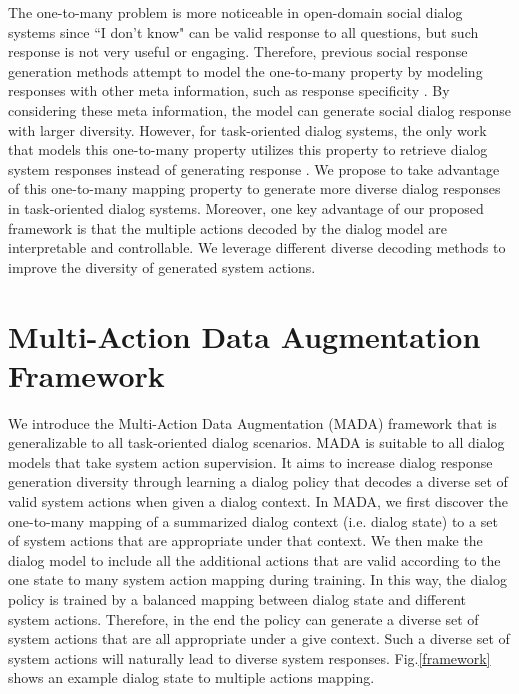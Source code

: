 \documentclass[letterpaper]{article} \usepackage{aaai20}  \usepackage{times}  \usepackage{helvet} \usepackage{courier}  \usepackage[hyphens]{url}  \usepackage{graphicx} \urlstyle{rm} \def\UrlFont{\rm}  \usepackage{graphicx}  \frenchspacing  \setlength{\pdfpagewidth}{8.5in}  \setlength{\pdfpageheight}{11in}  \usepackage{multirow}
\begin{document}
The one-to-many problem is more noticeable in open-domain social dialog systems since ``I don't know" can be valid response to all questions, but such response is not very useful or engaging. Therefore, previous social response generation methods attempt to model the one-to-many property by modeling responses with other meta information, such as response specificity \cite{zhou2017mechanism,zhou2018elastic}. By considering these meta information, the model can generate social dialog response with larger diversity. 
	However, for task-oriented dialog systems, the only work that models this one-to-many property utilizes this property to retrieve dialog system responses instead of generating response \cite{rajendran2018learning}. We propose to take advantage of this one-to-many mapping property to generate more diverse dialog responses in task-oriented dialog systems. Moreover, one key advantage of our proposed framework is that the multiple actions decoded by the dialog model are interpretable and controllable. We leverage different diverse decoding methods \cite{li2016simple,fan2018hierarchical,holtzman2019curious} to improve the diversity of generated system actions. 

	
	\section{Multi-Action Data Augmentation Framework}
	
	We introduce the Multi-Action Data Augmentation (MADA) framework that is generalizable to all task-oriented dialog scenarios. MADA is suitable to all dialog models that take system action supervision. It aims to increase dialog response generation diversity through learning a dialog policy that decodes a diverse set of valid system actions when given a dialog context.
	In MADA, we first discover the one-to-many mapping of a summarized dialog context (i.e. dialog state) to a set of system actions that are appropriate under that context. We then make the dialog model to include all the additional actions that are valid according to the one state to many system action mapping during training. In this way, the dialog policy is trained by a balanced mapping between dialog state and different system actions. Therefore, in the end the policy can generate a diverse set of system actions that are all appropriate under a give context. Such a diverse set of system actions will naturally lead to diverse system responses. Fig.\ref{framework} shows an example dialog state to multiple actions mapping. 
	
\end{document}
